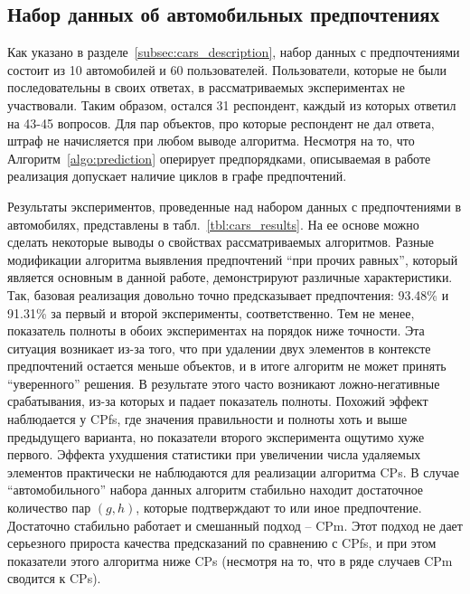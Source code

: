 	\subsection{Набор данных об автомобильных предпочтениях}
	\label{subsec:exp_cars}
		Как указано в разделе~\ref{subsec:cars_description}, набор данных с предпочтениями состоит из 10 автомобилей и 60 пользователей. Пользователи, которые не были последовательны в своих ответах, в рассматриваемых экспериментах не участвовали. Таким образом, остался 31 респондент, каждый из которых ответил на 43-45 вопросов. Для пар объектов, про которые респондент не дал ответа, штраф не начисляется при любом выводе алгоритма. Несмотря на то, что Алгоритм~\ref{algo:prediction} оперирует предпорядками, описываемая в работе реализация допускает наличие циклов в графе предпочтений.
	
		Результаты экспериментов, проведенные над набором данных с предпочтениями в автомобилях, представлены в табл.~\ref{tbl:cars_results}. На ее основе можно сделать некоторые выводы о свойствах рассматриваемых алгоритмов. Разные модификации алгоритма выявления предпочтений \enquote{при прочих равных}, который является основным в данной работе, демонстрируют различные характеристики. Так, базовая реализация довольно точно предсказывает предпочтения: 93.48\% и 91.31\% за первый и второй эксперименты, соответственно. Тем не менее, показатель полноты в обоих экспериментах на порядок ниже точности. Эта ситуация возникает из-за того, что при удалении двух элементов в контексте предпочтений остается меньше объектов, и в итоге алгоритм не может принять ``уверенного'' решения. В результате этого часто возникают ложно-негативные срабатывания, из-за которых и падает показатель полноты. Похожий эффект наблюдается у CPfs, где значения правильности и полноты хоть и выше предыдущего варианта, но показатели второго эксперимента ощутимо хуже первого. Эффекта ухудшения статистики при увеличении числа удаляемых элементов практически не наблюдаются для реализации алгоритма CPs. В случае ``автомобильного'' набора данных алгоритм стабильно находит достаточное количество пар $(g,h)$, которые подтверждают то или иное предпочтение. Достаточно стабильно работает и смешанный подход – CPm. Этот подход не дает серьезного прироста качества предсказаний по сравнению с CPfs, и при этом показатели этого алгоритма ниже CPs (несмотря на то, что в ряде случаев CPm сводится к CPs).
		

